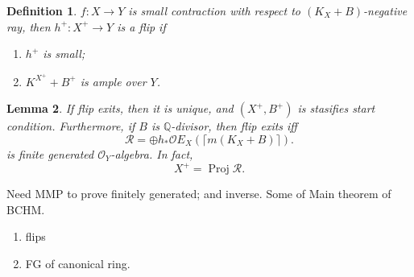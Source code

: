 \documentclass{article}
\newtheorem{defn}{Definition}[section]
\newtheorem{lem}[defn]{Lemma}
\begin{document}
\begin{defn}
  $f:X\to Y$ is small contraction with respect to $(K_{X}+B)$-negative ray, then $h^+ :X^+\to Y$ is a flip if 
  \begin{enumerate}
    \item $h^+$ is small;
    \item $K^{X^+}+B^+$ is ample over $Y$. 
  \end{enumerate}
\end{defn}
\begin{lem}
  If flip exits, then it is unique, and $(X^+,B^+)$ is stasifies start condition. Furthermore, if $B$ is $\mathbb{Q}$-divisor, then flip exits iff
  \[
   \mathcal{R}= \oplus h_*\mathcal{O}E_X(\lceil m(K_{X}+B)\rceil)
  .\]
 is finite generated $\mathcal{O}_Y$-algebra.
 In fact,
 \[
   X^+=\operatorname{Proj} \mathcal{R}
 .\]
 
\end{lem}
Need MMP to prove finitely generated; and inverse. Some of Main theorem of BCHM.
\begin{enumerate}
  \item flips
  \item FG of canonical ring.
\end{enumerate}
\end{document}
